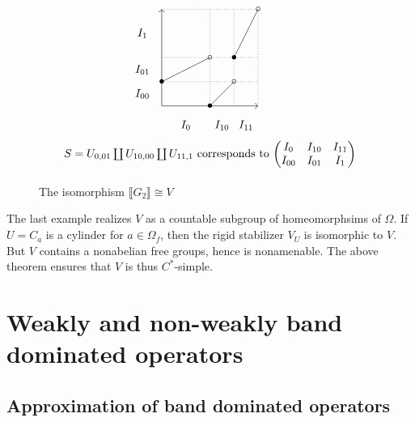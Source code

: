 \begin{figure}[ht]
\centering
\[\begin{tikzpicture}[scale=3] 

\draw[->] (0,0) -- (0,1);
\draw[->] (0,0) -- (1,0);
\draw[dotted] (1,0) -- (1,1);
\draw[dotted] (0,1) -- (1,1);

\draw (0,0.25) -- (0.5,0.5);
\draw (0.5, 0) -- (0.75,0.25);
\draw (0.75,0.5) -- (1,1);

\draw[dotted] (0.5,0) -- (0.5,1);
\draw[dotted] (0.75,0) -- (0.75,1);
\draw[dotted] (0,0.25) -- (1,0.25);
\draw[dotted] (0,0.5) -- (1,0.5);

\draw (0,0.25) node {$\bullet$}; \draw (0.5,0.5) node {$\circ$};
\draw (0.5,0)  node {$\bullet$}; \draw (0.75,0.25) node {$\circ$};
\draw (0.75,0.5) node {$\bullet$}; \draw (1,1) node {$\circ$};
\draw (0.5,-0.5) node {$S=U_{0,01}\coprod U_{10,00} \coprod U_{11,1}$ corresponds to $\begin{pmatrix} I_0 & I_{10} & I_{11} \\ I_{00} & I_{01} & I_1\end{pmatrix}$} ;


\draw (0.25,-0.2) node {$I_{0}$};
\draw (0.625,-0.2) node {$I_{10}$};
\draw (0.875,-0.2) node {$I_{11}$};
\draw (-0.2,0.125) node {$I_{00}$};
\draw (-0.2,0.375) node {$I_{01}$};
\draw (-0.2, 0.75) node {$I_{1}$};
\end{tikzpicture} \] 
\caption{The isomorphism $\llbracket G_2 \rrbracket \cong V$}
\end{figure}

The last example realizes $V$ as a countable subgroup of homeomorphsims of $\Omega$. If $U=C_a$ is a cylinder for $a\in \Omega_f$, then the rigid stabilizer $V_U$ is isomorphic to $V$. But $V$ contains a nonabelian free groups, hence is nonamenable. The above theorem ensures that $V$ is thus $C^*$-simple.  \\

\newpage
\section{Weakly and non-weakly band dominated operators}

\subsection{Approximation of band dominated operators}


